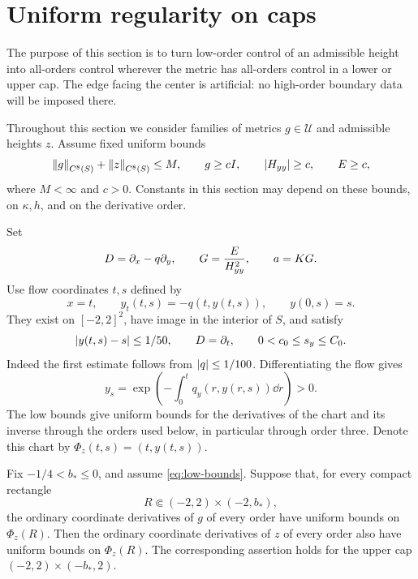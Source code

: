 \section{Uniform regularity on caps}\label{sec:caps}

The purpose of this section is to turn low-order control of an
admissible height into all-orders control wherever the metric has
all-orders control in a lower or upper cap. The edge facing the
center is artificial: no high-order boundary data will be imposed
there.

Throughout this section we consider families of metrics \(g\in\mathcal U\)
and admissible heights \(z\). Assume fixed uniform bounds
\begin{equation}\label{eq:low-bounds}
\left\lVert g\right\rVert_{C^8(S)}+\left\lVert z\right\rVert_{C^8(S)}\le M,\qquad
g\ge cI,\qquad \left\lvert H_{yy}\right\rvert\ge c,\qquad E\ge c,
\end{equation}
where \(M<\infty\) and \(c>0\). Constants in this section may depend
on these bounds, on \(\kappa,h\), and on the derivative order.

Set
\begin{equation}\label{eq:DGa}
D=\partial_x-q\partial_y,\qquad G=\frac E{H_{yy}^2},\qquad a=KG.
\end{equation}
Use flow coordinates \(t,s\) defined by
\begin{equation}\label{eq:flow}
x=t,\qquad y_t(t,s)=-q(t,y(t,s)),\qquad y(0,s)=s.
\end{equation}
They exist on \([-2,2]^2\), have image in the interior of \(S\),
and satisfy
\begin{equation}\label{eq:flow-bounds}
\left\lvert y(t,s)-s\right\rvert\le1/50,\qquad D=\partial_t,\qquad
0<c_0\le s_y\le C_0.
\end{equation}
Indeed the first estimate follows from \(\left\lvert q\right\rvert\le1/100\).
Differentiating the flow gives
\[
y_s=\exp\left(-\int_0^t q_y(r,y(r,s))\dd r\right)>0.
\]
The low bounds give uniform bounds for the derivatives of the chart
and its inverse through the orders used below, in particular through
order three. Denote this chart by \(\Phi_z(t,s)=(t,y(t,s))\).

\begin{proposition}\label{prop:cap}
Fix \(-1/4<b_*\le0\), and assume \eqref{eq:low-bounds}.
Suppose that, for every compact rectangle
\[
R\Subset(-2,2)\times(-2,b_*),
\]
the ordinary coordinate derivatives of \(g\) of every order have
uniform bounds on \(\Phi_z(R)\).
Then the ordinary coordinate derivatives of \(z\) of every order
also have uniform bounds on \(\Phi_z(R)\).
The corresponding assertion holds for the upper cap
\((-2,2)\times(-b_*,2)\).
\end{proposition}

